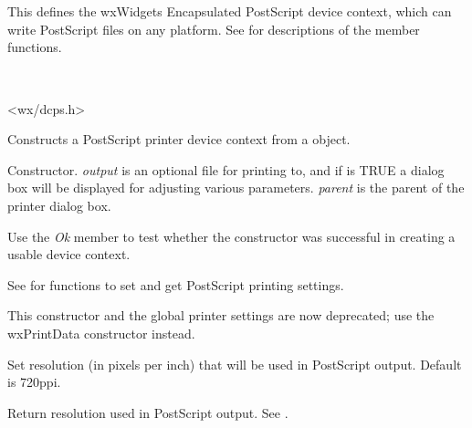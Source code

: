 \section{}\label{wxpostscriptdc}

This defines the wxWidgets Encapsulated PostScript device context,
which can write PostScript files on any platform. See  for
descriptions of the member functions.


\\


<wx/dcps.h>



Constructs a PostScript printer device context from a  object.


Constructor. {\it output} is an optional file for printing to, and if
 is TRUE a dialog box will be displayed for adjusting
various parameters. {\it parent} is the parent of the printer dialog box.

Use the {\it Ok} member to test whether the constructor was successful
in creating a usable device context.

See  for functions to set and
get PostScript printing settings.

This constructor and the global printer settings are now deprecated;
use the wxPrintData constructor instead.


\label{wxpostscriptdcsetresolution}


Set resolution (in pixels per inch) that will be used in PostScript
output. Default is 720ppi.

\label{wxpostscriptdcgetresolution}


Return resolution used in PostScript output. See 
.

